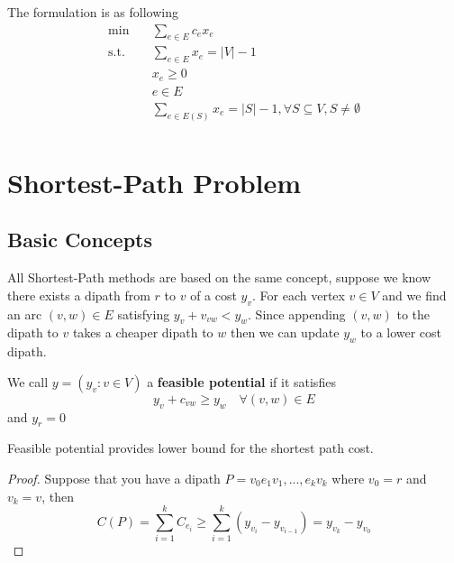 				The formulation is as following
				\begin{align}
					\min \quad & \sum_{e\in E} c_ex_e \\
					\text{s.t.} \quad & \sum_{e\in E} x_e = |V| - 1 \\
					                  & x_e \ge 0\\
					                  & e\in E \\
					                  & \sum_{e\in E(S)} x_e = |S| - 1, \forall S\subseteq V, S\ne \emptyset \\
				\end{align}

		\chapter{Shortest-Path Problem}
			\section{Basic Concepts}
				All Shortest-Path methods are based on the same concept, suppose we know there exists a dipath from $r$ to $v$ of a cost $y_v$. For each vertex $v \in V$ and we find an arc $(v, w) \in E$ satisfying $y_v + v_{vw} < y_w$. Since appending $(v, w)$ to the dipath to $v$ takes a cheaper dipath to $w$ then we can update $y_w$ to a lower cost dipath.

				\begin{definition}
					We call $y = (y_v: v\in V)$ a \textbf{feasible potential} if it satisfies
					\begin{equation}
						y_v + c_{vw} \ge y_w \quad \forall (v, w) \in E
					\end{equation}
					and $y_r = 0$
				\end{definition}

				\begin{proposition}
					Feasible potential provides lower bound for the shortest path cost.
				\end{proposition}

				\begin{proof}
					Suppose that you have a dipath $P = v_0e_1v_1,...,e_kv_k$ where $v_0 = r$ and $v_k = v$, then
					\begin{equation}
						C(P) = \sum_{i=1}^k C_{e_i} \ge \sum_{i=1}^k(y_{v_i} - y_{v_{i-1}}) = y_{v_k} - y_{v_0}
					\end{equation}
				\end{proof}

